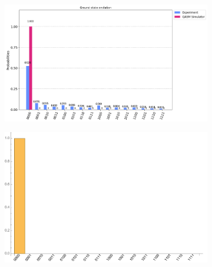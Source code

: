 \documentclass[10pt]{amsart}
\theoremstyle{definition}
\begin{document}
\begin{figure}[hbt]
  \begin{subfigure}{0.4\textwidth}
    \centering
    \includegraphics[width=0.9\linewidth]{input0_quantum.png}
  \end{subfigure}
  \begin{subfigure}{0.4\textwidth}
    \centering
    \includegraphics[width=0.9\linewidth]{input0_exact.pdf}
  \end{subfigure}
  

\end{figure}
\end{document}
